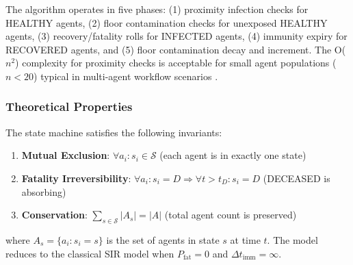 The algorithm operates in five phases: (1) proximity infection checks for HEALTHY agents, (2) floor contamination checks for unexposed HEALTHY agents, (3) recovery/fatality rolls for INFECTED agents, (4) immunity expiry for RECOVERED agents, and (5) floor contamination decay and increment. The O($n^2$) complexity for proximity checks is acceptable for small agent populations ($n < 20$) typical in multi-agent workflow scenarios \cite{qian2023communicative}.

\subsubsection{Theoretical Properties}

The state machine satisfies the following invariants:

\begin{enumerate}
    \item \textbf{Mutual Exclusion}: $\forall a_i: s_i \in \mathcal{S}$ (each agent is in exactly one state)
    \item \textbf{Fatality Irreversibility}: $\forall a_i: s_i = D \Rightarrow \forall t > t_D: s_i = D$ (DECEASED is absorbing)
    \item \textbf{Conservation}: $\sum_{s \in \mathcal{S}} |A_s| = |A|$ (total agent count is preserved)
\end{enumerate}

where $A_s = \{a_i : s_i = s\}$ is the set of agents in state $s$ at time $t$. The model reduces to the classical SIR model when $P_{\text{fat}} = 0$ and $\Delta t_{\text{imm}} = \infty$.
